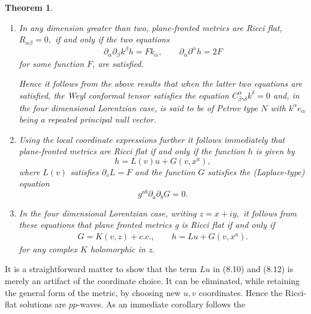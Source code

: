 \documentclass[12pt,a4paper]{article}
\newcounter{theorem}
\newtheorem{theorem}{Theorem}[section]   %
\newcounter{eg}
\def\p{\partial}
\begin{document}
\begin{theorem}                                         \label{th4}

\begin{enumerate}

\item In any dimension greater than two, plane-fronted metrics are Ricci
flat, $R_{\alpha\beta}=0,$ if and only if the two equations%
$$
\p_{\alpha}\p_{\beta}k^{\beta} h  = 
F k_{\alpha}, \qquad \p_\alpha \p^{\alpha} h = 2F
$$
for some function $F$, are satisfied.

Hence it follows from the above results that when the latter two
equations are satisfied, the Weyl conformal tensor satisfies the
equation $C_{\beta\gamma\delta}^{\alpha} k^{\delta}=0$ and, in the
four dimensional Lorentzian case, is said to be of Petrov type $N$ with
$k^{\alpha}e_{\alpha}$ being a repeated principal null vector.

\item Using the local coordinate expressions further it follows
  immediately that {plane-fronted metrics are Ricci flat} if and only
  if the function $h$ is given by%
\begin{equation}
h = L(v) u + G(v,x^{a}),
\end{equation}
where $L(v)$ satisfies $\p_v L = F$ and the function  $G$
satisfies the (Laplace-type) equation
\begin{equation}
g^{ab} \p_{a}\p_{b} G = 0.                          \label{laplace}
\end{equation}

\item In the {four dimensional Lorentzian case}, writing $z=x+iy,$ it
follows from these equations that plane fronted metrics g is 
{\it Ricci flat} if and only if
\begin{eqnarray}
G = K(v,z)+c.c., \qquad h = Lu+G(v,x^{a}).        \label{dcr}
\end{eqnarray}
for {any} complex $K$ holomorphic in z.

\end{enumerate}
\end{theorem}


It is a straightforward matter to show that the term $Lu$ in (8.10)
and (8.12) is merely an artifact of the coordinate choice. It can be
eliminated, while retaining the general form of the metric, by
choosing new $u,v$ coordinates.  Hence the Ricci-flat solutions are
$pp$-waves. As an immediate corollary follows the
\end{document}
